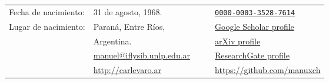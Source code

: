 %
%
\begin{center}
	\begin{tabular}{l l p{1cm} c l}
    Fecha de nacimiento:                                  & 31 de agosto, 1968.                                                  &  &          & \href{https://orcid.org/0000-0003-3528-7614}{\texttt{0000-0003-3528-7614}}                                          \\

    Lugar de nacimiento:                                  & Paraná, Entre Ríos,                                                  &  &  & \href{https://scholar.google.com.ar/citations?user=FoBqqJgAAAAJ                    & hl=en}{Google Scholar profile} \\
                                                          & Argentina.                                                           &  &          & \href{https://arxiv.org/a/carlevaro_m_1.html}{arXiv profile}                                                        \\
		      & \href{mailto:manuel@iflysib.unlp.edu.ar}{manuel@iflysib.unlp.edu.ar} &  & \color{DimGrey}{\aiResearchGate}  & \href{https://www.researchgate.net/profile/Manuel-Carlevaro}{ResearchGate profile}                                  \\
		 & \href{http://carlevaro.ar}{http://carlevaro.ar}                      &  & \color{DimGrey}{\faGithub}        & \href{https://github.com/manuxch}{https://github.com/manuxch}
	\end{tabular}
\end{center}
